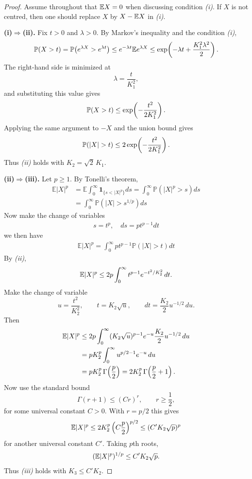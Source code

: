 \begin{proof}
Assume throughout that $\mathbb{E} X=0$ when discussing condition \emph{(i)}.
If $X$ is not centred, then one should replace $X$ by $X-\mathbb{E} X$ in \emph{(i)}.

\medskip
\noindent
\textbf{(i)$\Rightarrow$(ii).}
Fix $t>0$ and $\lambda>0$. By Markov's inequality and the condition \emph{(i)},
\[
\mathbb{P}(X>t)
=
\mathbb{P}\bigl(e^{\lambda X}>e^{\lambda t}\bigr)
\le
e^{-\lambda t}\mathbb{E} e^{\lambda X}\le\exp\!\left(-\lambda t+\frac{K_1^2\lambda^2}{2}\right).
\]
The right-hand side is minimized at
\[
\lambda=\frac{t}{K_1^2},
\]
and substituting this value gives
\[
\mathbb{P}(X>t)\le \exp\!\left(-\frac{t^2}{2K_1^2}\right).
\]
Applying the same argument to $-X$ and the union bound gives
\[
\pr(|X|>t)
\le
2\exp\!\left(-\frac{t^2}{2K_1^2}\right).
\]
Thus \emph{(ii)} holds with $K_2=\sqrt{2}\,K_1$.

\medskip
\noindent
\textbf{(ii)$\Rightarrow$(iii).}
Let $p\ge 1$. By Tonelli's theorem,
\begin{align*}
\mathbb{E}|X|^p&=\mathbb{E} \int_0^{\infty} \mathbf{1}_{\{s<|X|^p\}} d s=\int_0^{\infty} \mathbb{P}(|X|^p>s) d s\\
&=\int_0^{\infty} \mathbb{P}\left(|X|>s^{1 / p}\right) d s
\end{align*}
Now make the change of variables
\begin{align*}
s=t^p, \quad d s=p t^{p-1} d t
\end{align*}
we then have
\begin{align*}
\mathbb{E}|X|^p=\int_0^{\infty} p t^{p-1} \mathbb{P}(|X|>t) d t
\end{align*}
By \emph{(ii)},
\[
\mathbb{E} |X|^p
\le
2p\int_0^\infty t^{p-1}e^{-t^2/K_2^2}\,dt.
\]
Make the change of variable
\[
u=\frac{t^2}{K_2^2},
\qquad
t=K_2\sqrt{u},
\qquad
dt=\frac{K_2}{2}u^{-1/2}\,du.
\]
Then
\begin{align*}
\mathbb{E} |X|^p
&\le
2p\int_0^\infty (K_2\sqrt{u})^{p-1}e^{-u}\frac{K_2}{2}u^{-1/2}\,du \\
&=
pK_2^p\int_0^\infty u^{p/2-1}e^{-u}\,du \\
&=
pK_2^p\,\Gamma\!\left(\frac p2\right)
=
2K_2^p\,\Gamma\!\left(\frac p2+1\right).
\end{align*}
Now use the standard bound
\[
\Gamma(r+1)\le (Cr)^r,
\qquad r\ge \frac12,
\]
for some universal constant $C>0$. With $r=p/2$ this gives
\[
\mathbb{E} |X|^p
\le
2K_2^p \left(C\frac p2\right)^{p/2}
\le
(C'K_2\sqrt p)^p
\]
for another universal constant $C'$. Taking $p$th roots,
\[
(\mathbb{E} |X|^p)^{1/p}\le C'K_2\sqrt p.
\]
Thus \emph{(iii)} holds with $K_3\le C'K_2$.


\end{proof}
